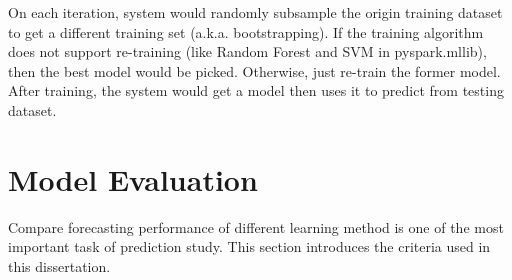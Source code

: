 On each iteration, system would randomly subsample the origin training dataset to get a different training set (a.k.a. bootstrapping). If the training algorithm does not support re-training (like Random Forest and SVM in pyspark.mllib), then the best model would be picked. Otherwise, just re-train the former model.\\


After training, the system would get a model then uses it to predict from testing dataset.



\section{Model Evaluation}
Compare forecasting performance of different learning method is one of the most important task of prediction study. This section introduces the criteria used in this dissertation.\\


